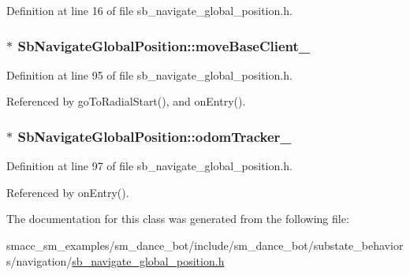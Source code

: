 Definition at line 16 of file sb\+\_\+navigate\+\_\+global\+\_\+position.\+h.

\subsubsection[{\texorpdfstring{move\+Base\+Client\+\_\+}{moveBaseClient_}}]{$\ast$ Sb\+Navigate\+Global\+Position\+::move\+Base\+Client\+\_\+\hspace{0.3cm}{\ttfamily [private]}}\hypertarget{classSbNavigateGlobalPosition_ad98d35df0281643268e2b00450b00af5}{}\label{classSbNavigateGlobalPosition_ad98d35df0281643268e2b00450b00af5}


Definition at line 95 of file sb\+\_\+navigate\+\_\+global\+\_\+position.\+h.



Referenced by go\+To\+Radial\+Start(), and on\+Entry().

\subsubsection[{\texorpdfstring{odom\+Tracker\+\_\+}{odomTracker_}}]{$\ast$ Sb\+Navigate\+Global\+Position\+::odom\+Tracker\+\_\+\hspace{0.3cm}{\ttfamily [private]}}\hypertarget{classSbNavigateGlobalPosition_af7f17a2dabc667afa3a31c1205427ca6}{}\label{classSbNavigateGlobalPosition_af7f17a2dabc667afa3a31c1205427ca6}


Definition at line 97 of file sb\+\_\+navigate\+\_\+global\+\_\+position.\+h.



Referenced by on\+Entry().



The documentation for this class was generated from the following file\+:\begin{DoxyCompactItemize}
\item 
smacc\+\_\+sm\+\_\+examples/sm\+\_\+dance\+\_\+bot/include/sm\+\_\+dance\+\_\+bot/substate\+\_\+behaviors/navigation/\hyperlink{sb__navigate__global__position_8h}{sb\+\_\+navigate\+\_\+global\+\_\+position.\+h}\end{DoxyCompactItemize}
